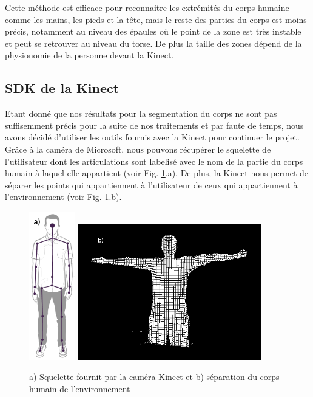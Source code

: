 
Cette méthode est efficace pour reconnaitre les extrémités du corps humaine comme les mains, les pieds et la tête, mais le reste des parties du corps 
est moins précis, notamment au niveau des épaules où le point de la zone est très instable et peut se retrouver au niveau du torse. De plus la taille 
des zones dépend de la physionomie de la personne devant la Kinect. 

\subsection{SDK de la Kinect}
Etant donné que nos résultats pour la segmentation du corps ne sont pas suffisemment précis pour la suite de nos traitements et par faute de
temps, nous avons décidé d'utiliser les outils fournis avec la Kinect pour continuer le projet. Grâce à la caméra de Microsoft, nous pouvons
récupérer le squelette de l'utilisateur dont les articulations sont labelisé avec le nom de la partie du corps humain à laquel elle appartient
(voir Fig. \ref{fig:kinect}.a). De plus, la Kinect nous permet de séparer les points qui appartiennent à l'utilisateur de ceux qui appartiennent
à l'environnement (voir Fig. \ref{fig:kinect}.b).\\

\begin{figure}[!ht]
  \begin{center}
    \includegraphics[width=2cm]{image/kinectSkeleton.png} 
    \includegraphics[width=8cm]{image/seg1.PNG}
    \caption{a) Squelette fournit par la caméra Kinect et b) séparation du corps humain de l'environnement}
    \label{fig:kinect}
  \end{center}
\end{figure}

